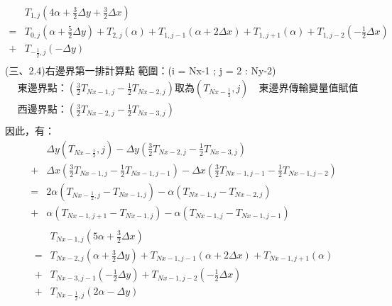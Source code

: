 \documentclass[12pt]{article}
\begin{document}
\begin{equation}
  \begin{split}
    &T_{1,j}(4\alpha+ \frac{3}{2} \Delta y + \frac{3}{2}\Delta x)\\
     = &T_{0,j}(\alpha+\frac{5}{2}\Delta y)+T_{2,j}(\alpha)+T_{1,j-1}(\alpha+2\Delta x)+T_{1,j+1}(\alpha)+T_{1,j-2}(-\frac{1}{2}\Delta x)\\
     + &T_{-\frac{1}{2},j}(-\Delta y)\\
\end{split}
\end{equation}
\noindent (三、2.4)右邊界第一排計算點
\noindent 範圍：(i = Nx-1 ; j = 2 : Ny-2)\\
\begin{equation}
  \begin{split}
    &\mbox{東邊界點：}(\frac{3}{2}T_{Nx-1,j} - \frac{1}{2}T_{Nx-2,j})\mbox{取為}(T_{Nx-\frac{1}{2}},j) \quad \mbox{東邊界傳輸變量值賦值}\\
    &\mbox{西邊界點：}(\frac{3}{2}T_{Nx-2,j} - \frac{1}{2}T_{Nx-3,j})\\
  \end{split}
\end{equation}
\noindent 因此，有：
\begin{equation}
  \begin{split}
    &\Delta y(T_{Nx-\frac{1}{2}},j)-\Delta y(\frac{3}{2}T_{Nx-2,j} - \frac{1}{2}T_{Nx-3,j})\\
    +&\Delta x(\frac{3}{2}T_{Nx-1,j} - \frac{1}{2}T_{Nx-1,j-1})- \Delta x(\frac{3}{2}T_{Nx-1,j-1} - \frac{1}{2}T_{Nx-1,j-2})\\
    =&2\alpha(T_{Nx-\frac{1}{2},j} - T_{Nx-1,j})-\alpha(T_{Nx-1,j} - T_{Nx-2,j}) \\
    +&\alpha(T_{Nx-1,j+1} - T_{Nx-1,j}) - \alpha(T_{Nx-1,j} - T_{Nx-1,j-1})\\
  \end{split}
\end{equation}
\begin{equation}
  \begin{split}
    &T_{Nx-1,j}(5\alpha+ \frac{3}{2}\Delta x)\\
  = &T_{Nx-2,j}(\alpha+\frac{3}{2}\Delta y)+T_{Nx-1,j-1}(\alpha+2\Delta x)+T_{Nx-1,j+1}(\alpha)\\+&T_{Nx-3,j-1}(-\frac{1}{2}\Delta y)+T_{Nx-1,j-2}(-\frac{1}{2}\Delta x)\\
  + &T_{Nx-\frac{1}{2},j}(2\alpha - \Delta y)\\
  \end{split}
\end{equation}
\end{document}
